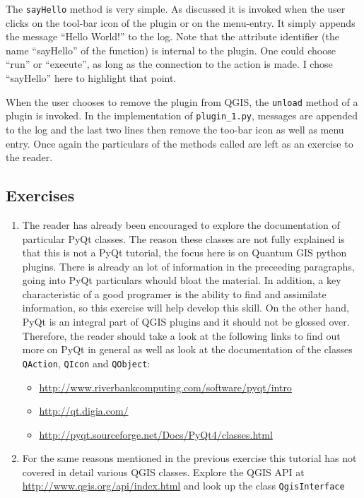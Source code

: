 \par%
The \lstinline{sayHello} method is very simple. As discussed it is invoked when the user clicks on the tool-bar icon of the plugin or on the menu-entry. It simply appends the message ``Hello World!'' to the log.  Note that the attribute identifier (the name ``sayHello'' of the function) is internal to the plugin. One could choose ``run'' or ``execute'', as long as the connection to the action is made. I chose ``sayHello'' here to highlight that point.
\par%
When the user chooses to remove the plugin from QGIS, the \lstinline{unload} method of a plugin is invoked. In the implementation of \lstinline{plugin_1.py}, messages are appended to the log and the last two lines then remove the too-bar icon as well as menu entry. Once again the particulars of the methods called are left as an exercise to the reader.

\subsection{Exercises}
\label{ssect:plugin_1_exercises}
\begin{enumerate}
\item The reader has already been encouraged to explore the documentation of particular PyQt classes. The reason these classes are not fully explained is that this is not a PyQt tutorial, the focus here is on Quantum GIS python plugins. There is already an lot of information in the preceeding paragraphs, going into PyQt particulars whould bloat the material. In addition, a key characteristic of a good programer is the ability to find and assimilate information, so this exercise will help develop this skill. On the other hand, PyQt is an integral part of QGIS plugins and it should not be glossed over. Therefore, the reader should take a look at  the following links to find out more on PyQt in general as well as look at the documentation of the classes \lstinline{QAction}, \lstinline{QIcon} and \lstinline{QObject}:
\begin{itemize}
   \item \url{http://www.riverbankcomputing.com/software/pyqt/intro}
   \item \url{http://qt.digia.com/}
   \item \url{http://pyqt.sourceforge.net/Docs/PyQt4/classes.html}
\end{itemize}
\item For the same reasons mentioned in the previous exercise this tutorial has not covered in detail various QGIS classes. Explore the QGIS API at \url{http://www.qgis.org/api/index.html} and look up the class \lstinline{QgisInterface}
\end{enumerate}
